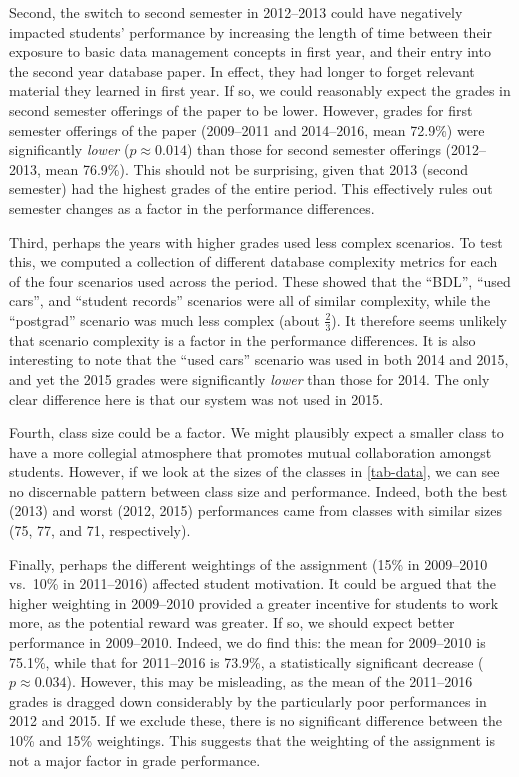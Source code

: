 \documentclass[sigconf, authordraft, capitalise]{acmart}
\begin{document}
Second, the switch to second semester in 2012--2013 could have negatively impacted students' performance by increasing the length of time between their exposure to basic data management concepts in first year, and their entry into the second year database paper. In effect, they had longer to forget relevant material they learned in first year. If so, we could reasonably expect the grades in second semester offerings of the paper to be lower. However, grades for first semester offerings of the paper (2009--2011 and 2014--2016, mean 72.9\%) were significantly \emph{lower} (\(p \approx 0.014\)) than those for second semester offerings (2012--2013, mean 76.9\%). This should not be surprising, given that 2013 (second semester) had the highest grades of the entire period. This effectively rules out semester changes as a factor in the performance differences.

Third, perhaps the years with higher grades used less complex scenarios. To test this, we computed a collection of different database complexity metrics \cite{Jamil.B-2010a-SMARtS,Piattini.M-2001a-Table,Pavlic.M-2008a-Database,Calero.C-2001a-Database,Sinha.B-2014a-Estimation} for each of the four scenarios used across the period. These showed that the ``BDL'', ``used cars'', and ``student records'' scenarios were all of similar complexity, while the ``postgrad'' scenario was much less complex (about \(\frac{2}{3}\)). It therefore seems unlikely that scenario complexity is a factor in the performance differences. It is also interesting to note that the ``used cars'' scenario was used in both 2014 and 2015, and yet the 2015 grades were significantly \emph{lower} than those for 2014. The only clear difference here is that our system was not used in 2015.

Fourth, class size could be a factor. We might plausibly expect a smaller class to have a more collegial atmosphere that promotes mutual collaboration amongst students. However, if we look at the sizes of the classes in \cref{tab-data}, we can see no discernable pattern between class size and performance. Indeed, both the best (2013) and worst (2012, 2015) performances came from classes with similar sizes (75, 77, and 71, respectively).

Finally, perhaps the different weightings of the assignment (15\% in 2009--2010 vs.\ 10\% in 2011--2016) affected student motivation. It could be argued that the higher weighting in 2009--2010 provided a greater incentive for students to work more, as the potential reward was greater. If so, we should expect better performance in 2009--2010. Indeed, we do find this: the mean for 2009--2010 is 75.1\%, while that for 2011--2016 is 73.9\%, a statistically significant decrease (\(p \approx 0.034\)). However, this may be misleading, as the mean of the 2011--2016 grades is dragged down considerably by the particularly poor performances in 2012 and 2015. If we exclude these, there is no significant difference between the 10\% and 15\% weightings. This suggests that the weighting of the assignment is not a major factor in grade performance.
\end{document}
